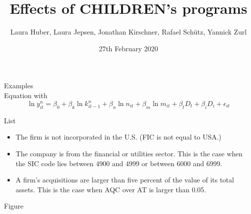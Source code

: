 \documentclass[12pt, a4paper]{article}\usepackage[]{graphicx}\usepackage[]{color}
\title{Effects of CHILDREN's programs}
\author{Laura Huber, Laura Jepsen, Jonathan Kirschner, Rafael Schütz, Yannick Zurl}
\date{27th February 2020}
\begin{document}
\begin{titlepage}
\maketitle
\end{titlepage}

\tableofcontents
\listoftables
\listoffigures

Examples\\

Equation with\\

\begin{equation}
\label{ModelProdu}
\ln y_{it}^{n} = \beta_0 + \beta_k \ln k_{it-1}^{n} + \beta_n \ln n_{it} + \beta_m \ln m_{it} + \beta_t D_t + \beta_i D_i + \epsilon_{it}
\end{equation}

List\\

\begin{itemize}
  \item{The firm is not incorporated in the U.S. (FIC is not equal to USA.)}
  \item{The company is from the financial or utilities sector. This is the case when the SIC code lies between 4900 and 4999 or between 6000 and 6999.}
  \item{A firm's acquisitions are larger than five percent of the value of its total assets. This is the case when AQC over AT is larger than 0.05.} 
\end{itemize}


Figure\\
\end{document}
